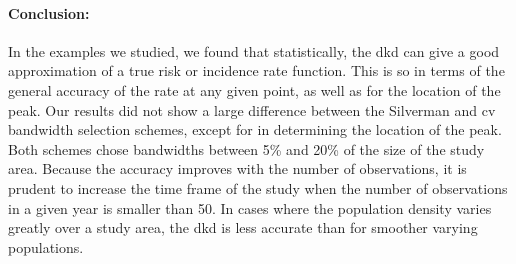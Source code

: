 \begin{onehalfspace}
\paragraph*{Conclusion:}

In the examples we studied,
we found that statistically,
the \acrlong{dkd} can give a good approximation of a true risk or incidence rate function.
This is so in terms of the general accuracy of the rate at any given point,
as well as for the location of the peak.
Our results did not show a large difference between the Silverman and \acrlong{cv} bandwidth selection schemes,
except for in determining the location of the peak.
Both schemes chose bandwidths between 5\% and 20\% of the size of the study area.
Because the accuracy improves with the number of observations,
it is prudent to increase the time frame of the study when the number of observations in a given year is smaller than 50.
In cases where the population density varies greatly over a study area,
the \acrlong{dkd} is less accurate than for smoother varying populations.

\end{onehalfspace}